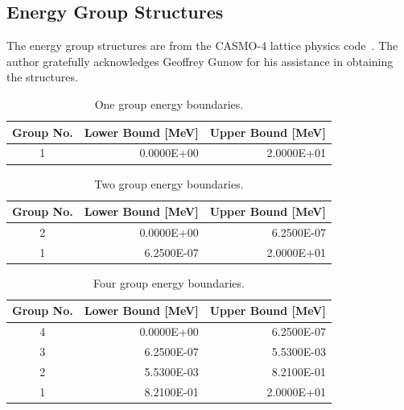 \begin{appendices}

\chapter{Energy Group Structures}
\label{app:energy-groups}

The energy group structures are from the CASMO-4 lattice physics code~\cite{edenius1995casmo}. The author gratefully acknowledges Geoffrey Gunow for his assistance in obtaining the structures.

\renewcommand{\arraystretch}{0.8}%

\begin{table}[h!]
  \centering
  \footnotesize
  \caption{One group energy boundaries.}
  \label{table:app-1-groups} 
  \vspace{14pt}
  \begin{tabular}{c r r}
    \toprule
    {\bf Group No.} &
    {\bf Lower Bound [MeV]} &
    {\bf Upper Bound [MeV]} \\
    \midrule
1 & 0.0000E+00 & 2.0000E+01 \\
    \bottomrule
   \end{tabular}
\end{table}

\begin{table}[h!]
  \centering
  \footnotesize
  \caption{Two group energy boundaries.}
  \label{table:app-2-groups} 
  \vspace{14pt}
  \begin{tabular}{c r r}
    \toprule
    {\bf Group No.} &
    {\bf Lower Bound [MeV]} &
    {\bf Upper Bound [MeV]} \\
    \midrule
2 & 0.0000E+00 & 6.2500E-07 \\
1 & 6.2500E-07 & 2.0000E+01 \\
  \bottomrule
 \end{tabular}
\end{table}

\begin{table}[h!]
  \centering
  \footnotesize
  \caption{Four group energy boundaries.}
  \label{table:app-4-groups} 
  \vspace{14pt}
  \begin{tabular}{c r r}
    \toprule
    {\bf Group No.} &
    {\bf Lower Bound [MeV]} &
    {\bf Upper Bound [MeV]} \\
    \midrule
4 & 0.0000E+00 & 6.2500E-07 \\
3 & 6.2500E-07 & 5.5300E-03 \\
2 & 5.5300E-03 & 8.2100E-01 \\
1 & 8.2100E-01 & 2.0000E+01 \\
  \bottomrule
 \end{tabular}
\end{table}


\end{appendices}
